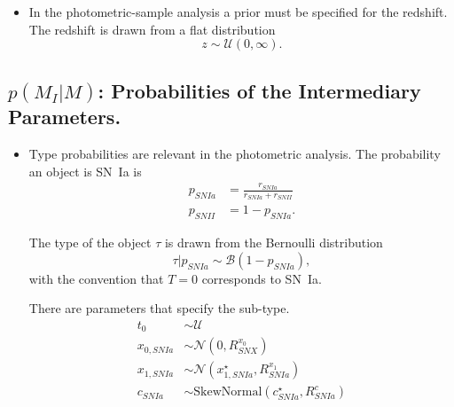 \documentclass[preprint,3p]{elsarticle}
\begin{document}
\begin{itemize}
\item 
In the photometric-sample analysis a prior must be specified for the redshift.  The redshift is drawn from a flat distribution
\begin{equation}
z\sim \mathcal{U}(0,\infty).
\end{equation}
\end{itemize}

\subsection{$p(M_I|M)$: Probabilities of the Intermediary Parameters.}
\begin{itemize}
\item Type probabilities are relevant in the photometric analysis.
The probability an object is SN~Ia is
\begin{align}
p_{SNIa} &= \frac{r_{SNIa}}{r_{SNIa}+r_{SNII}} \nonumber \\
p_{SNII}&=1-p_{SNIa}.
\label{prob:eqn}
\end{align}

The type of the object $\tau$ is drawn from the Bernoulli distribution 
\begin{equation}
\tau | p_{SNIa} \sim \mathcal{B}(1-p_{SNIa}),
\end{equation}
with the convention that $T=0$ corresponds to SN~Ia.


There are parameters that specify the sub-type.
\begin{align}
t_0 & \sim \mathcal{U}\\
x_{0, SNIa} & \sim \mathcal{N}(0,R^{x_0}_{SNX})\\
x_{1,SNIa} & \sim \mathcal{N}(x_{1,SNIa}^\star,R^{x_1}_{SNIa})\\
c_{SNIa} & \sim \text{SkewNormal}(c^\star_{SNIa},R^{c}_{SNIa} )
\end{align}

\end{itemize}
\end{document}

